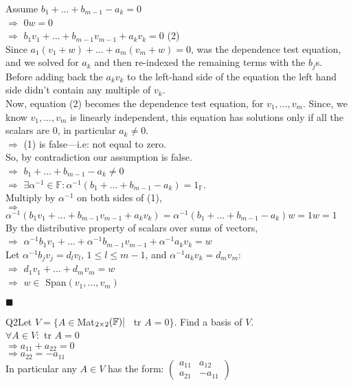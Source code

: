 \documentclass{article}
\begin{document}
Assume $b_1 + ... +b_{m-1} -a_k = 0$\\
$\Rightarrow$ $0w = 0$\\
$\Rightarrow$ $b_{1}v_1+ ... + b_{m-1}v_{m-1} + a_kv_k = 0$ (2)\\
Since $a_1(v_1 + w) + ... + a_m(v_m + w) = 0$, was the dependence test equation,
and we solved for $a_k$ and then re-indexed the remaining terms with
the $b_j$s.\\
Before
adding back the $a_kv_k$ to the left-hand side of the equation the
left hand side didn't contain any multiple of $v_k$.\\
Now, equation (2)
becomes the dependence test equation, for $v_1, ... ,v_m$. Since, we
know $v_1, ... ,v_m$ is linearly independent, this equation has
solutions only if all the scalars are $0$, in particular $a_k \neq 0$.\\
$\Rightarrow$ (1) is false---i.e: not equal to zero.\\
So, by contradiction our assumption is false.\\
$\Rightarrow$ $b_1 + ... +b_{m-1} -a_k \neq 0$\\
$\Rightarrow$ $\exists \alpha^{-1} \in \mathbb{F}: \alpha^{-1}(b_1 +
... +b_{m-1} -a_k) = 1_{\mathbb{F}} $.\\
Multiply by $\alpha^{-1}$ on both sides of (1),\\
$\Rightarrow$ $\alpha^{-1}(b_{1}v_1+ ... + b_{m-1}v_{m-1} + a_kv_k) =
\alpha^{-1}(b_1 + ... +b_{m-1} -a_k)w = 1w =1$\\
By the distributive property of scalars over sums of vectors,\\
$\Rightarrow$ $\alpha^{-1}b_{1}v_1+ ... +\alpha^{-1}b_{m-1}v_{m-1} +
\alpha^{-1}a_kv_k = w$\\
Let $\alpha^{-1}b_jv_j=d_lv_l$, $1 \leq l \leq m-1$, and
$\alpha^{-1}a_kv_k=d_mv_m$:\\
$\Rightarrow$ $d_{1}v_1+ ... +d_{m}v_{m}= w$\\
$\Rightarrow$ $ w \in$ Span$(v_1, ... ,v_m)$\\
\begin{flushright}
  $\blacksquare$
\end{flushright}
\newpage

Q2\quad Let $V = \{A \in$Mat$_{2\times2}(\mathbb{F}) |\enskip$ tr $A =
0\}$. Find a basis of $V$.\\

$\forall A \in V:$ tr $A = 0$\\
$\Rightarrow a_{11}+a_{22}=0$\\
$\Rightarrow a_{22}=-a_{11}$\\
In particular any $A \in V$ has the form:
$\begin{pmatrix}
a_{11}&a_{12}\\
a_{21}&-a_{11}
\end{pmatrix}$\\
\end{document}
